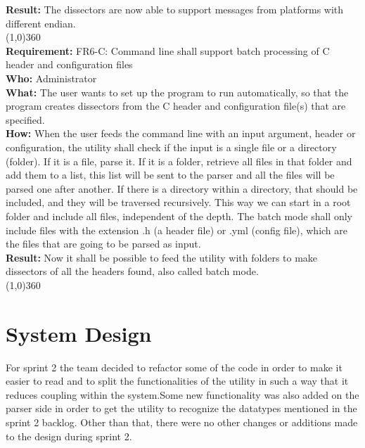 \textbf{Result:} The dissectors are now able to support messages from platforms with different endian.\\
\line(1,0){360}\\
\textbf{Requirement:} FR6-C: Command line shall support batch processing of C header and configuration files\\
\textbf{Who:} Administrator\\
\textbf{What:} The user wants to set up the program to run automatically, so that the program creates dissectors from the C header and configuration file(s) that are specified.\\
\textbf{How:} When the user feeds the command line with an input argument, header or configuration, the utility shall check if the input is a single file or a directory (folder). If it is a file, parse it. If it is a folder, retrieve all files in that folder and add them to a list, this list will be sent to the parser and all the files will be parsed one after another. If there is a directory within a directory, that should be included, and they will be traversed recursively. This way we can start in a root folder and include all files, independent of the depth. The batch mode shall only include files with the extension .h (a header file) or .yml (config file), which are the files that are going to be parsed as input.\\
\textbf{Result:} Now it shall be possible to feed the utility with folders to make dissectors of all the headers found, also called batch mode.\\
\line(1,0){360}\\	


\section{System Design}
For sprint 2 the team decided to refactor some of the code in order to make it easier to read and to split the functionalities of the utility in such a way that it reduces coupling within the system.Some new functionality was also added on the parser side in order to get the utility to recognize the datatypes mentioned in the sprint 2 backlog. Other than that, there were no other changes or additions made to the design during sprint 2.

